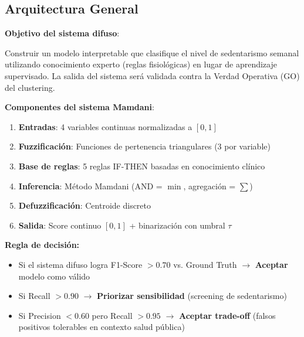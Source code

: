 \documentclass[12pt,letterpaper,twoside]{report}
\begin{document}
\subsection{Arquitectura General}

\begin{hipotesisbox}
\textbf{Objetivo del sistema difuso}:

Construir un modelo interpretable que clasifique el nivel de sedentarismo semanal utilizando conocimiento experto (reglas fisiológicas) en lugar de aprendizaje supervisado. La salida del sistema será validada contra la Verdad Operativa (GO) del clustering.
\end{hipotesisbox}

\begin{estadisticobox}
\textbf{Componentes del sistema Mamdani}:

\begin{enumerate}[noitemsep]
    \item \textbf{Entradas}: 4 variables continuas normalizadas a $[0,1]$
    \item \textbf{Fuzzificación}: Funciones de pertenencia triangulares (3 por variable)
    \item \textbf{Base de reglas}: 5 reglas IF-THEN basadas en conocimiento clínico
    \item \textbf{Inferencia}: Método Mamdani (AND = $\min$, agregación = $\sum$)
    \item \textbf{Defuzzificación}: Centroide discreto
    \item \textbf{Salida}: Score continuo $[0,1]$ + binarización con umbral $\tau$
\end{enumerate}
\end{estadisticobox}

\begin{reglabox}
\textbf{Regla de decisión:}

\begin{itemize}[noitemsep]
    \item Si el sistema difuso logra F1-Score $> 0.70$ vs. Ground Truth $\to$ \textbf{Aceptar} modelo como válido
    \item Si Recall $> 0.90$ $\to$ \textbf{Priorizar sensibilidad} (screening de sedentarismo)
    \item Si Precision $< 0.60$ pero Recall $> 0.95$ $\to$ \textbf{Aceptar trade-off} (falsos positivos tolerables en contexto salud pública)
\end{itemize}
\end{reglabox}
\end{document}
